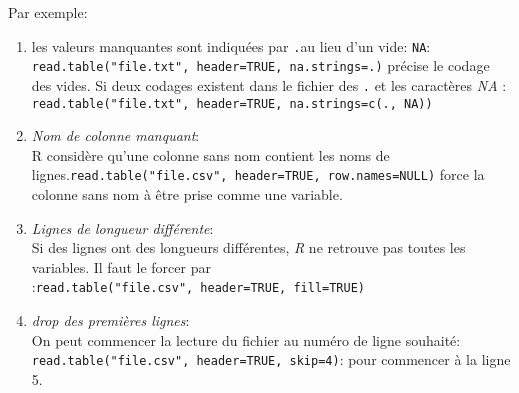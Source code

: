 \documentclass[]{book}
\newenvironment{Shaded}{\begin{snugshade}}{\end{snugshade}}
\newcommand{\CharTok}[1]{\textcolor[rgb]{0.31,0.60,0.02}{#1}}
\newcommand{\DataTypeTok}[1]{\textcolor[rgb]{0.13,0.29,0.53}{#1}}
\newcommand{\KeywordTok}[1]{\textcolor[rgb]{0.13,0.29,0.53}{\textbf{#1}}}
\newcommand{\NormalTok}[1]{#1}
\newcommand{\OperatorTok}[1]{\textcolor[rgb]{0.81,0.36,0.00}{\textbf{#1}}}
\newcommand{\OtherTok}[1]{\textcolor[rgb]{0.56,0.35,0.01}{#1}}
\newcommand{\StringTok}[1]{\textcolor[rgb]{0.31,0.60,0.02}{#1}}
\begin{document}
Par exemple:

\begin{Shaded}
\end{Shaded}

\begin{enumerate}
\def\labelenumi{\arabic{enumi}.}
\setcounter{enumi}{4}
\item
  les valeurs manquantes sont indiquées par \texttt{.}au lieu d'un vide: \texttt{NA}:\\
  \texttt{read.table("file.txt",\ header=TRUE,\ na.strings=\textquotesingle{}.\textquotesingle{})} précise le codage des vides. Si deux codages existent dans le fichier des \texttt{.} et les caractères \emph{NA} :
  \texttt{read.table("file.txt",\ header=TRUE,\ na.strings=c(\textquotesingle{}.\textquotesingle{},\ NA))}
\item
  \emph{Nom de colonne manquant}:\\
  R considère qu'une colonne sans nom contient les noms de lignes.\texttt{read.table("file.csv",\ header=TRUE,\ row.names=NULL)} force la colonne sans nom à être prise comme une variable.
\item
  \emph{Lignes de longueur différente}:\\
  Si des lignes ont des longueurs différentes, \emph{R} ne retrouve pas toutes les variables. Il faut le forcer par :\texttt{read.table("file.csv",\ header=TRUE,\ fill=TRUE)}
\item
  \emph{drop des premières lignes}:\\
  On peut commencer la lecture du fichier au numéro de ligne souhaité: \texttt{read.table("file.csv",\ header=TRUE,\ skip=4)}: pour commencer à la ligne 5.
\end{enumerate}
\end{document}
